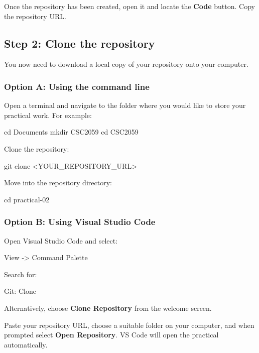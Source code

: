 \documentclass{csc2059practical}
\begin{document}
Once the repository has been created, open it and locate the \textbf{Code} button. Copy the repository URL.

\subsection{Step 2: Clone the repository}

You now need to download a local copy of your repository onto your computer.

\subsubsection{Option A: Using the command line}

Open a terminal and navigate to the folder where you would like to store your practical work. For example:

\begin{bashcode}
cd Documents
mkdir CSC2059
cd CSC2059
\end{bashcode}

Clone the repository:

\begin{bashcode}
git clone <YOUR_REPOSITORY_URL>
\end{bashcode}

Move into the repository directory:

\begin{bashcode}
cd practical-02
\end{bashcode}

\subsubsection{Option B: Using Visual Studio Code}

Open Visual Studio Code and select:

\begin{terminal}
View -> Command Palette
\end{terminal}

Search for:

\begin{terminal}
Git: Clone
\end{terminal}

Alternatively, choose \textbf{Clone Repository} from the welcome screen.

Paste your repository URL, choose a suitable folder on your computer, and when prompted select \textbf{Open Repository}. VS Code will open the practical automatically.
\end{document}
